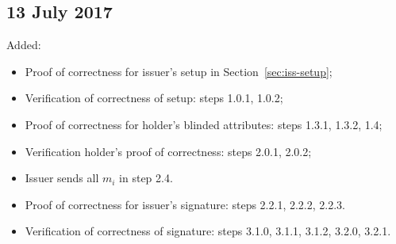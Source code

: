 { \subsection{13 July 2017}
 Added:
 \begin{itemize}    
 \item Proof of correctness for issuer's setup in Section~\ref{sec:iss-setup};
 \item Verification of correctness of setup: steps 1.0.1, 1.0.2;
 \item Proof of correctness for holder's blinded attributes: steps 1.3.1, 1.3.2, 1.4;
 \item Verification holder's proof of correctness: steps 2.0.1, 2.0.2;
 \item Issuer sends all $m_i$ in step 2.4.
 \item Proof of correctness for issuer's signature: steps 2.2.1, 2.2.2, 2.2.3.
 \item  Verification of correctness of signature: steps 3.1.0, 3.1.1, 3.1.2, 3.2.0, 3.2.1.
 \end{itemize}
 }{}